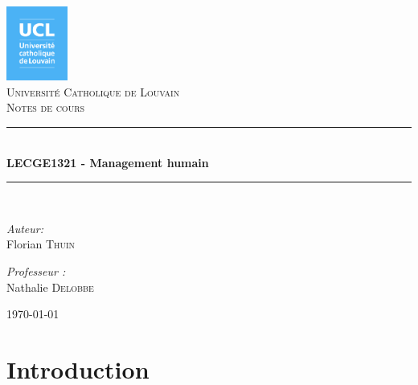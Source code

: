 \documentclass[12pt]{article}
\newcommand{\HRule}{\rule{\linewidth}{0.5mm}}
\begin{document}
\begin{titlepage}
\begin{center}

\includegraphics[width=0.15\textwidth]{./logo_ucl.png}~\\[1cm]

\textsc{\LARGE Université Catholique de Louvain}\\[1.5cm]

\textsc{\Large Notes de cours}\\[0.5cm]

\HRule \\[0.4cm]
{ \huge \bfseries LECGE1321 - Management humain \\[0.4cm] }

\HRule \\[1.5cm]

\noindent
\begin{minipage}[t]{0.4\textwidth}
\begin{flushleft} \large
\emph{Auteur:}\\
Florian \textsc{Thuin}
\end{flushleft}
\end{minipage}%
\begin{minipage}[t]{0.4\textwidth}
\begin{flushright} \large
\emph{Professeur :} \\
Nathalie \textsc{Delobbe}
\end{flushright}
\end{minipage}

\vfill

{\large \today}

\end{center}
\end{titlepage}

\tableofcontents

\section{Introduction}
\end{document}
